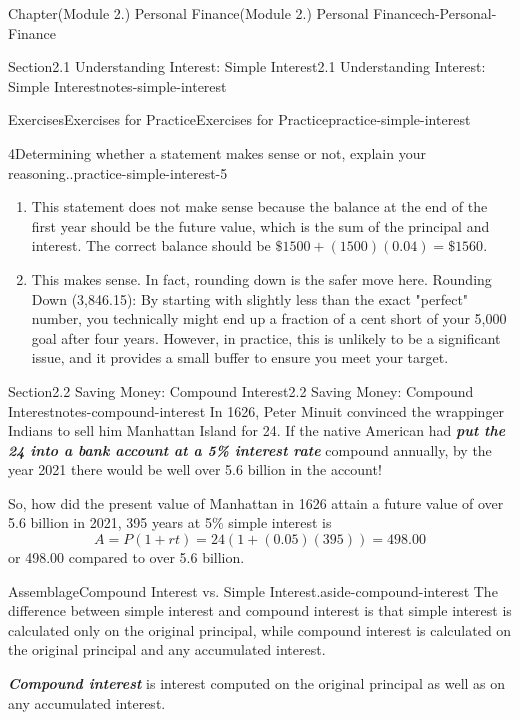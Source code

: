\documentclass[oneside,10pt,]{book}
\newcommand{\alert}[1]{\textbf{\textit{#1}}}
\begin{document}
\begin{chapterptx}{Chapter}{(Module 2.) Personal Finance}{}{(Module 2.) Personal Finance}{}{}{ch-Personal-Finance}
\begin{sectionptx}{Section}{2.1 Understanding Interest: Simple Interest}{}{2.1 Understanding Interest: Simple Interest}{}{}{notes-simple-interest}
\begin{exercises-subsection-numberless}{Exercises}{Exercises for Practice}{}{Exercises for Practice}{}{}{practice-simple-interest}
\begin{divisionexercise}{4}{Determining whether a statement makes sense or not, explain your reasoning..}{}{practice-simple-interest-5}
\begin{enumerate}[label={(\alph*)}]
\item{}This statement does not make sense because the balance at the end of the first year should be the future value, which is the sum of the principal and interest. The correct balance should be \(\$1500 + (1500)(0.04) = \$1560.\)%
\item{}This makes sense. In fact, rounding down is the safer move here. Rounding Down (\textdollar{}3,846.15): By starting with slightly less than the exact "perfect" number, you technically might end up a fraction of a cent short of your \textdollar{}5,000 goal after four years. However, in practice, this is unlikely to be a significant issue, and it provides a small buffer to ensure you meet your target.%
\end{enumerate}
\end{divisionexercise}%
\end{exercises-subsection-numberless}
\end{sectionptx}
%
%
\typeout{************************************************}
\typeout{************************************************}
%
\begin{sectionptx}{Section}{2.2 Saving Money: Compound Interest}{}{2.2 Saving Money: Compound Interest}{}{}{notes-compound-interest}
In 1626, Peter Minuit convinced the wrappinger Indians to sell him Manhattan Island for \textdollar{}24. If the native American had \alert{put the \textdollar{}24 into a bank account at a 5\% interest rate} compound annually, by the year 2021 there would be well over \textdollar{}5.6 billion in the account!%
\par
So, how did the present value of Manhattan in 1626 attain a future value of over \textdollar{}5.6 billion in 2021, 395 years at 5\% simple interest is%
\begin{equation*}
A=P(1+rt)=24(1+(0.05)(395))=498.00
\end{equation*}
or \textdollar{}498.00 compared to over \textdollar{}5.6 billion.%
\begin{assemblage}{Assemblage}{Compound Interest vs. Simple Interest.}{aside-compound-interest}%
The difference between simple interest and compound interest is that simple interest is calculated only on the original principal, while compound interest is calculated on the original principal and any accumulated interest.%
\par
\alert{Compound interest} is interest computed on the original principal as well as on any accumulated interest.%

\end{assemblage}
\end{sectionptx}
\end{chapterptx}
\end{document}
